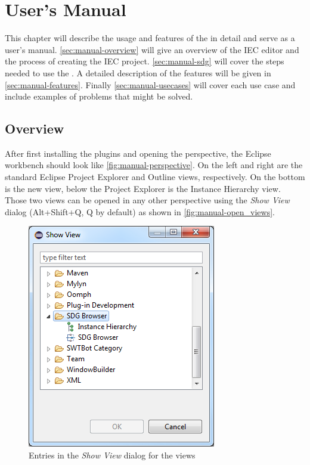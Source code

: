 \chapter{User's Manual} \label{ch:manual}

This chapter will describe the usage and features of the \SB in detail and serve as a user's manual. 
\autoref{sec:manual-overview} will give an overview of the IEC editor and the process of creating the IEC project. 
\autoref{sec:manual-sdg} will cover the steps needed to use the \SB. A detailed description of the \SB features will be 
given in \autoref{sec:manual-features}. Finally \autoref{sec:manual-usecases} will cover each use case and include 
examples of problems that might be solved.


\section{Overview} \label{sec:manual-overview}

After first installing the \SB plugins and opening the \emph{\SB} perspective, the Eclipse workbench should look like 
\autoref{fig:manual-perspective}. On the left and right are the standard Eclipse Project Explorer and Outline views, 
respectively. On the bottom is the new \SB view, below the Project Explorer is the Instance Hierarchy view. Those two 
views can be opened in any other perspective using the \emph{Show View} dialog (Alt+Shift+Q, Q by default) as shown in 
\autoref{fig:manual-open_views}.

\begin{figure}[hp]
  \centering
    \includegraphics[scale=0.55]{bilder/manual-open_views}
  \caption{Entries in the \emph{Show View} dialog for the \SB views}
  \label{fig:manual-open_views}
\end{figure}

